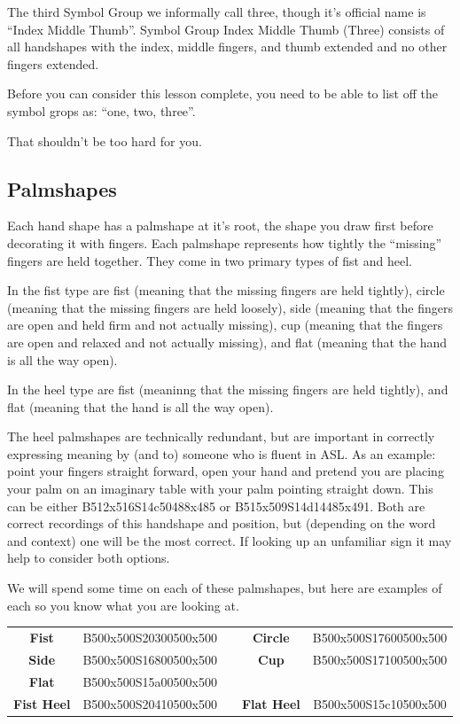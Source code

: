 \documentclass{article}
\begin{document}
The third Symbol Group we informally call three, though it's official name is ``Index Middle Thumb''.
Symbol Group Index Middle Thumb (Three) consists of all handshapes with the index, middle fingers, and thumb extended and no other fingers extended.

Before you can consider this lesson complete, you need to be able to list off the symbol grops as:
``one, two, three''.

That shouldn't be too hard for you.

\subsection{Palmshapes}

Each hand shape has a palmshape at it's root, the shape you draw first before decorating it with fingers.
Each palmshape represents how tightly the ``missing'' fingers are held together.
They come in two primary types of fist and heel.

In the fist type are fist (meaning that the missing fingers are held tightly),
circle (meaning that the missing fingers are held loosely),
side (meaning that the fingers are open and held firm and not actually missing),
cup (meaning that the fingers are open and relaxed and not actually missing), and
flat (meaning that the hand is all the way open).

In the heel type are fist (meaninng that the missing fingers are held tightly),
and flat (meaning that the hand is all the way open).

The heel palmshapes are technically redundant, but are important in correctly expressing meaning by (and to) someone who is fluent in ASL.
As an example: point your fingers straight forward, open your hand and pretend you are placing your palm on an imaginary table with your palm pointing straight down.
This can be either B512x516S14c50488x485 or B515x509S14d14485x491.
Both are correct recordings of this handshape and position, but (depending on the word and context) one will be the most correct.
If looking up an unfamiliar sign it may help to consider both options.

We will spend some time on each of these palmshapes, but here are examples of each so you know what you are looking at.

\begin{center}
\begin{tabular}{ccccc}
\textbf{Fist}     &B500x500S20300500x500&&\textbf{Circle}   &B500x500S17600500x500\\
\textbf{Side}     &B500x500S16800500x500&&\textbf{Cup}      &B500x500S17100500x500\\
\textbf{Flat}     &B500x500S15a00500x500\\
\textbf{Fist Heel}&B500x500S20410500x500&&\textbf{Flat Heel}&B500x500S15c10500x500\\
\end{tabular}
\end{center}
\end{document}
